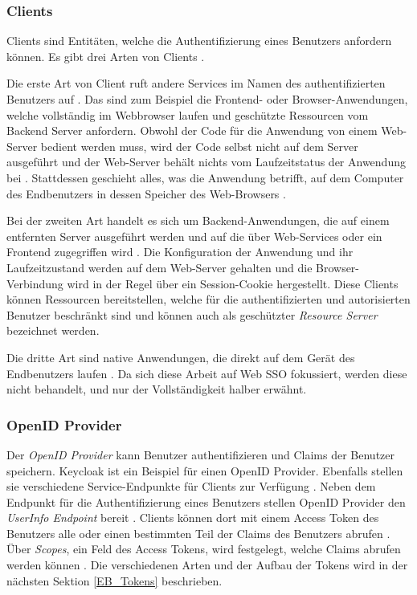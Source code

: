 \subsubsection{Clients} \label{EB_Client}

Clients sind Entitäten, welche die Authentifizierung eines Benutzers anfordern können. Es gibt drei Arten von Clients \cite{OAuth2inAction}.

Die erste Art von Client ruft andere Services im Namen des authentifizierten Benutzers auf \cite[Sec. 1.1]{RFC6749} \cite[Managing Clients]{keycloakDocs}. Das sind zum Beispiel die Frontend- oder Browser-Anwendungen, welche vollständig im Webbrowser laufen und geschützte Ressourcen vom Backend Server anfordern. Obwohl der Code für die Anwendung von einem Web-Server bedient werden muss, wird der Code selbst nicht auf dem Server ausgeführt und der Web-Server behält nichts vom Laufzeitstatus der Anwendung bei \cite{OAuth2inAction}. Stattdessen geschieht alles, was die Anwendung betrifft, auf dem Computer des Endbenutzers in dessen Speicher des Web-Browsers \cite{OAuth2inAction}.

Bei der zweiten Art handelt es sich um Backend-Anwendungen, die auf einem entfernten Server ausgeführt werden und auf die über Web-Services oder ein Frontend zugegriffen wird \cite{OAuth2inAction}. Die Konfiguration der Anwendung und ihr Laufzeitzustand werden auf dem Web-Server gehalten und die Browser-Verbindung wird in der Regel über ein Session-Cookie hergestellt. Diese Clients können Ressourcen bereitstellen, welche für die authentifizierten und autorisierten Benutzer beschränkt sind und können auch als geschützter \textit{Resource Server} bezeichnet werden.

Die dritte Art sind native Anwendungen, die direkt auf dem Gerät des Endbenutzers laufen \cite{OAuth2inAction}. Da sich diese Arbeit auf Web SSO fokussiert, werden diese nicht behandelt, und nur der Vollständigkeit halber erwähnt.

\subsubsection{OpenID Provider}

Der \textit{OpenID Provider} kann Benutzer authentifizieren und Claims der Benutzer speichern. Keycloak ist ein Beispiel für einen OpenID Provider. Ebenfalls stellen sie verschiedene Service-Endpunkte für Clients zur Verfügung \cite[Keycloak URI Endpoints]{keycloakDocs}. Neben dem Endpunkt für die Authentifizierung eines Benutzers stellen OpenID Provider den \textit{UserInfo Endpoint} bereit \cite[UserInfo Endpoint]{EB4} \cite[Keycloak URI Endpoints]{keycloakDocs}. Clients können dort mit einem Access Token des Benutzers alle oder einen bestimmten Teil der Claims des Benutzers abrufen \cite[UserInfo Endpoint]{EB4}. Über \textit{Scopes}, ein Feld des Access Tokens, wird festgelegt, welche Claims abrufen werden können \cite[Requesting Claims]{EB4}. Die verschiedenen Arten und der Aufbau der Tokens wird in der nächsten Sektion \ref{EB_Tokens} beschrieben.

